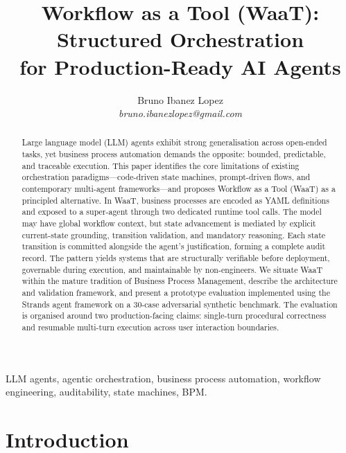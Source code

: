 \documentclass[10pt,conference]{IEEEtran}
\begin{document}
\title{Workflow as a Tool (WaaT): Structured Orchestration\\
for Production-Ready AI Agents}

\author{Bruno Ibanez Lopez\\
\textit{bruno.ibanezlopez@gmail.com}}

\maketitle

\begin{abstract}
Large language model (LLM) agents exhibit strong generalisation
across open-ended tasks, yet business process automation demands
the opposite: bounded, predictable, and traceable execution.  This
paper identifies the core limitations of existing orchestration
paradigms---code-driven state machines, prompt-driven flows, and
contemporary multi-agent frameworks---and proposes Workflow as a
Tool (WaaT) as a principled alternative.  In WaaT, business
processes are encoded as YAML definitions and exposed to a
super-agent through two dedicated runtime tool calls.  The model
may have global workflow context, but state advancement is
mediated by explicit current-state grounding, transition
validation, and mandatory reasoning.  Each state transition is
committed alongside the agent's justification, forming a complete
audit record.  The pattern yields systems that are structurally
verifiable before deployment, governable during execution, and
maintainable by non-engineers.  We situate WaaT within the mature tradition of
Business Process Management, describe the architecture and
validation framework, and present a prototype evaluation implemented
using the Strands agent framework on a 30-case adversarial synthetic
benchmark.  The evaluation is organised around two production-facing
claims: single-turn procedural correctness and resumable multi-turn
execution across user interaction boundaries.
\end{abstract}

\begin{IEEEkeywords}
LLM agents, agentic orchestration, business process automation,
workflow engineering, auditability, state machines, BPM.
\end{IEEEkeywords}


\section{Introduction}
\end{document}
